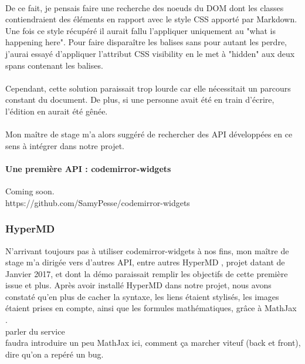 \documentclass[12pt]{article}
\begin{document}
\paragraph{}
De ce fait, je pensais faire une recherche des noeuds du DOM dont les classes contiendraient des éléments en rapport avec le style CSS apporté par Markdown. Une fois ce style récupéré il aurait fallu l'appliquer uniquement au "what is happening here". Pour faire disparaître les balises sans pour autant les perdre, j'aurai essayé d'appliquer l'attribut CSS visibility en le met à "hidden" aux deux spans contenant les balises.
\paragraph{}
Cependant, cette solution paraissait trop lourde car elle nécessitait un parcours constant du document. De plus, si une personne avait été en train d'écrire, l'édition en aurait été gênée.

\paragraph{}
Mon maître de stage m'a alors suggéré de rechercher des API développées en ce sens à intégrer dans notre projet.

\paragraph{Une première API : codemirror-widgets}
Coming soon.\\
https://github.com/SamyPesse/codemirror-widgets


\subsubsection{HyperMD}
N'arrivant toujours pas à utiliser codemirror-widgets à nos fins, mon maître de stage m'a dirigée vers d'autres API, entre autres HyperMD \cite{hypermd}, projet datant de Janvier 2017, et dont la démo \cite{demo} paraissait remplir les objectifs de cette première issue et plus.
Après avoir installé HyperMD dans notre projet, nous avons constaté qu'en plus de cacher la syntaxe, les liens étaient stylisés, les images étaient prises en compte, ainsi que les formules mathématiques, grâce à MathJax \cite{mathjax}.\\


parler du service\\
faudra introduire un peu MathJax ici, comment ça marcher viteuf (back et front), dire qu'on a repéré un bug.\\
\end{document}
